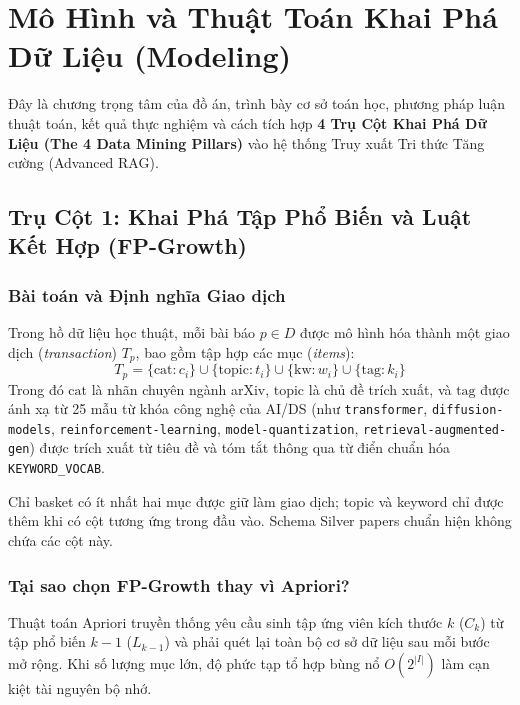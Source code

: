 
\chapter{Mô Hình và Thuật Toán Khai Phá Dữ Liệu (Modeling)}
\label{chap:modeling}

Đây là chương trọng tâm của đồ án, trình bày cơ sở toán học, phương pháp luận thuật toán, kết quả thực nghiệm và cách tích hợp \textbf{4 Trụ Cột Khai Phá Dữ Liệu (The 4 Data Mining Pillars)} vào hệ thống Truy xuất Tri thức Tăng cường (Advanced RAG).

\section{Trụ Cột 1: Khai Phá Tập Phổ Biến và Luật Kết Hợp (FP-Growth)}

\subsection{Bài toán và Định nghĩa Giao dịch}
Trong hồ dữ liệu học thuật, mỗi bài báo $p \in D$ được mô hình hóa thành một giao dịch (\textit{transaction}) $T_p$, bao gồm tập hợp các mục (\textit{items}):
\begin{equation}
  T_p = \{\text{cat}:c_i\} \cup \{\text{topic}:t_i\} \cup \{\text{kw}:w_i\} \cup \{\text{tag}:k_i\}
\end{equation}
Trong đó $\text{cat}$ là nhãn chuyên ngành arXiv, $\text{topic}$ là chủ đề trích xuất, và $\text{tag}$ được ánh xạ từ 25 mẫu từ khóa công nghệ của AI/DS (như \texttt{transformer}, \texttt{diffusion-models}, \texttt{reinforcement-learning}, \texttt{model-quantization}, \texttt{retrieval-augmented-gen}) được trích xuất từ tiêu đề và tóm tắt thông qua từ điển chuẩn hóa \texttt{KEYWORD\_VOCAB}.

Chỉ basket có ít nhất hai mục được giữ làm giao dịch; topic và keyword chỉ được thêm khi có cột tương ứng trong đầu vào. Schema Silver papers chuẩn hiện không chứa các cột này.

\subsection{Tại sao chọn FP-Growth thay vì Apriori?}
Thuật toán Apriori truyền thống yêu cầu sinh tập ứng viên kích thước $k$ ($C_k$) từ tập phổ biến $k-1$ ($L_{k-1}$) và phải quét lại toàn bộ cơ sở dữ liệu sau mỗi bước mở rộng. Khi số lượng mục lớn, độ phức tạp tổ hợp bùng nổ $O(2^{|I|})$ làm cạn kiệt tài nguyên bộ nhớ.


